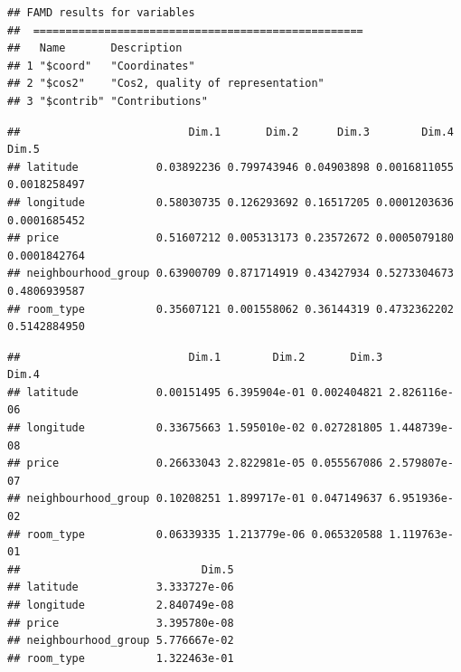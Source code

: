 \documentclass[
]{article}
\newenvironment{Shaded}{\begin{snugshade}}{\end{snugshade}}
\newcommand{\CommentTok}[1]{\textcolor[rgb]{0.56,0.35,0.01}{\textit{#1}}}
\newcommand{\KeywordTok}[1]{\textcolor[rgb]{0.13,0.29,0.53}{\textbf{#1}}}
\newcommand{\NormalTok}[1]{#1}
\newcommand{\OperatorTok}[1]{\textcolor[rgb]{0.81,0.36,0.00}{\textbf{#1}}}
\begin{document}
\begin{verbatim}
## FAMD results for variables 
##  ===================================================
##   Name       Description                      
## 1 "$coord"   "Coordinates"                    
## 2 "$cos2"    "Cos2, quality of representation"
## 3 "$contrib" "Contributions"
\end{verbatim}

\begin{Shaded}
\end{Shaded}

\begin{verbatim}
##                          Dim.1       Dim.2      Dim.3        Dim.4        Dim.5
## latitude            0.03892236 0.799743946 0.04903898 0.0016811055 0.0018258497
## longitude           0.58030735 0.126293692 0.16517205 0.0001203636 0.0001685452
## price               0.51607212 0.005313173 0.23572672 0.0005079180 0.0001842764
## neighbourhood_group 0.63900709 0.871714919 0.43427934 0.5273304673 0.4806939587
## room_type           0.35607121 0.001558062 0.36144319 0.4732362202 0.5142884950
\end{verbatim}

\begin{Shaded}
\end{Shaded}

\begin{verbatim}
##                          Dim.1        Dim.2       Dim.3        Dim.4
## latitude            0.00151495 6.395904e-01 0.002404821 2.826116e-06
## longitude           0.33675663 1.595010e-02 0.027281805 1.448739e-08
## price               0.26633043 2.822981e-05 0.055567086 2.579807e-07
## neighbourhood_group 0.10208251 1.899717e-01 0.047149637 6.951936e-02
## room_type           0.06339335 1.213779e-06 0.065320588 1.119763e-01
##                            Dim.5
## latitude            3.333727e-06
## longitude           2.840749e-08
## price               3.395780e-08
## neighbourhood_group 5.776667e-02
## room_type           1.322463e-01
\end{verbatim}
\end{document}
